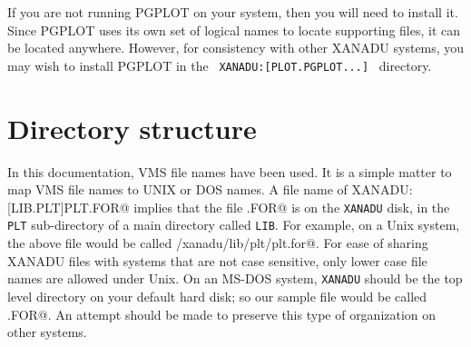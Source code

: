 If you are not running PGPLOT on your system,
then you will need to install it.
Since PGPLOT uses its own set of logical names to locate supporting files,
it can be located anywhere.
However, for consistency with other XANADU systems,
you may wish to install PGPLOT
in the \, {\tt XANADU:[PLOT.PGPLOT...]} \, directory.

\section{Directory structure}
In this documentation, VMS file names have been used.
It is a simple matter to map VMS file names to UNIX or DOS names.
A file name of \verb@ XANADU:[LIB.PLT]PLT.FOR@
implies that the file \verb@PLT.FOR@ is on the {\tt XANADU} disk,
in the {\tt PLT} sub-directory of a main directory called {\tt LIB}\@.
For example, on a Unix system,
the above file would be called \verb@/xanadu/lib/plt/plt.for@.
For ease of sharing XANADU files with systems that are not case sensitive,
only lower case file names are allowed under Unix.
On an MS-DOS system,
{\tt XANADU} should be the top level directory on your default hard disk;
so our sample file would be called \verb@\XANADU\LIB\PLT\PLT.FOR@.
An attempt should be made to preserve this type of organization on
other systems.

